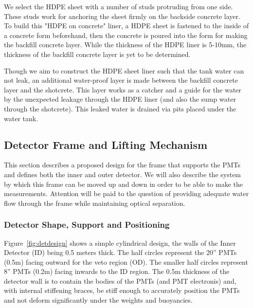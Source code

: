 We select the HDPE sheet with a number of studs protruding from one side. These studs work
for anchoring the sheet firmly on the backside concrete layer. To build this "HDPE on concrete"
liner, a HDPE sheet is fastened to the inside of a concrete form beforehand, then the concrete
is poured into the form for making the backfill concrete layer. While the thickness of the HDPE
liner is 5-10mm, the thickness of the backfill concrete layer is yet to be determined.

Though we aim to construct the HDPE sheet liner such that the tank water can not leak, an
additional water-proof layer is made between the backfill concrete layer and the shotcrete.
This layer works as a catcher and a guide for the water by the unexpected leakage through
the HDPE liner (and also the sump water through the shotcrete). This leaked water is drained
via pits placed under the water tank.


\subsection{Detector Frame and Lifting Mechanism}



This section describes a proposed design for the frame that supports the \nuprism
PMTs and defines both the inner and outer detector.  We will also describe the system
by which this frame can be moved up and down in order to be able to make the \nuprism measurements.
Attention will be paid to the question of providing adequate water flow through the \nuprism
frame while maintaining optical separation.

\subsubsection{Detector Shape, Support and Positioning}
Figure~\ref{fig:detdesign} shows a simple cylindrical design, the walls of the Inner Detector (ID) 
being 0.5 meters thick. The half circles represent the 20'' PMTs (0.5m) facing outward for the veto
region (OD). The smaller half circles represent 8'' PMTs (0.2m) facing inwards to the ID region.
 The 0.5m thickness of the detector wall is to contain the bodies of the PMTs (and PMT electronis)
 and, with internal
 stiffening braces, be stiff enough to accurately position the PMTs and not deform significantly 
under the weights and buoyancies. 

